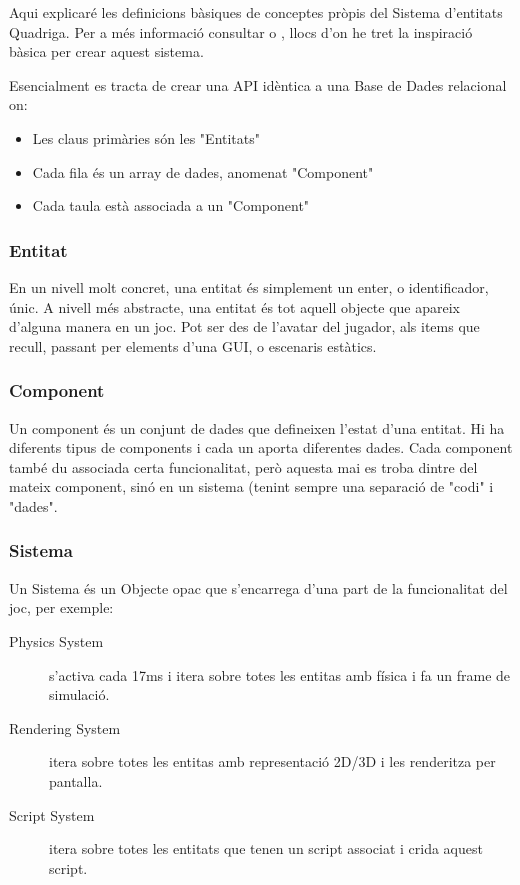 Aqui explicaré les definicions bàsiques de conceptes pròpis del Sistema d'entitats Quadriga. Per a més informació consultar \cite{EntityWikiB} o \cite{Martin07}, llocs d'on he tret la inspiració bàsica per crear aquest sistema.

Esencialment es tracta de crear una API idèntica a una Base de Dades relacional on:

\begin{itemize}
  \item Les claus primàries són les "Entitats"
  \item Cada fila és un array de dades, anomenat "Component"
  \item Cada taula està associada a un "Component"
\end{itemize}

\subsubsection{Entitat}

En un nivell molt concret, una entitat és simplement un enter, o identificador, únic. A nivell més abstracte, una entitat és tot aquell objecte que apareix d'alguna manera en un joc. Pot ser des de l'avatar del jugador, als items que recull, passant per elements d'una GUI, o escenaris estàtics.

\subsubsection{Component}

Un component és un conjunt de dades que defineixen l'estat d'una entitat. Hi ha diferents tipus de components i cada un aporta diferentes dades. Cada component també du associada certa funcionalitat, però aquesta mai es troba dintre del mateix component, sinó en un sistema (tenint sempre una separació de "codi" i "dades".

\subsubsection{Sistema}

Un Sistema és un Objecte opac que s'encarrega d'una part de la funcionalitat del joc, per exemple:
\begin{description}
  \item[Physics System] s'activa cada 17ms i itera sobre totes les entitas amb física i fa un frame de simulació.
  \item[Rendering System] itera sobre totes les entitas amb representació 2D/3D i les renderitza per pantalla.
  \item[Script System] itera sobre totes les entitats que tenen un script associat i crida aquest script.
\end{description}

